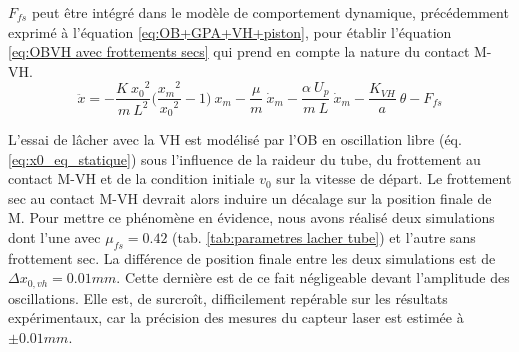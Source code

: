 $F_{fs}$ peut être intégré dans le modèle de comportement dynamique, précédemment exprimé à l'équation \ref{eq:OB+GPA+VH+piston}, pour établir l'équation \ref{eq:OBVH avec frottements secs} qui prend en compte la nature du contact M-VH.
\begin{equation}
\ddot{x} = - \frac{K\ {x_0}^2}{m\ L^2}\biggl(\frac{{x_m}^2}{{x_0}^2} 
-1\biggr)\ x_m - \frac{\mu}{m}\ \dot{x}_m - \frac{\alpha\ U_p}{m\ L}\ \dot{x}_m - \frac{K_{VH}}{a}\ \theta - F_{fs}
\label{eq:OBVH avec frottements secs}
\end{equation}

L'essai de lâcher avec la VH est modélisé par l'OB en oscillation libre (éq. \ref{eq:x0_eq_statique}) sous l'influence de la raideur du tube, du frottement au contact M-VH et de la condition initiale $v_0$ sur la vitesse de départ. Le frottement sec au contact M-VH devrait alors induire un décalage sur la position finale de M. Pour mettre ce phénomène en évidence, nous avons réalisé deux simulations dont l'une avec $\mu_{fs}=0.42$ (tab. \ref{tab:parametres lacher tube}) et l'autre sans frottement sec. La différence de position finale entre les deux simulations est de $\Delta x_{0,vh}=0.01mm$. Cette dernière est de ce fait négligeable devant l'amplitude des oscillations. Elle est, de surcroît, difficilement repérable sur les résultats expérimentaux, car la précision des mesures du capteur laser est estimée à $\pm0.01mm$.
